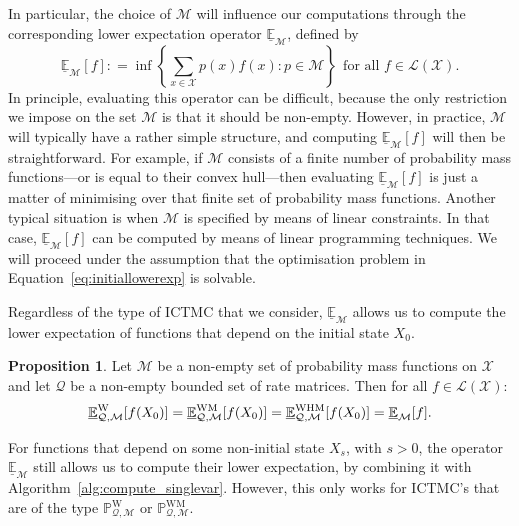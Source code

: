 \documentclass[10pt,a4paper]{paper}
\theoremstyle{definition}
\newtheorem{proposition}[theorem]{Proposition}
\newcommand{\states}{\mathcal{X}}
\newcommand{\processes}{\mathbb{P}}
\newcommand{\wprocesses}{\processes^{\mathrm{W}}}
\newcommand{\wmprocesses}{\processes^{\mathrm{WM}}}
\newcommand{\gambles}{\mathcal{L}}
\newcommand{\gamblesX}{\gambles(\states)}
\newcommand{\rateset}{\mathcal{Q}}
\newcommand{\coloneqq}{:\!=}
\newcommand{\ictmc}{{ICTMC}}
\begin{document}
In particular, the choice of $\mathcal{M}$ will influence our computations through the corresponding lower expectation operator $\underline{\mathbb{E}}_{\mathcal{M}}$, defined by
\begin{equation}\label{eq:initiallowerexp}
\underline{\mathbb{E}}_{\mathcal{M}}[f]
\coloneqq
\inf
\left\{\sum_{x\in\states}p(x)f(x)\colon p\in\mathcal{M}\right\}
~~\text{for all $f\in\gamblesX$.}
\end{equation}
In principle, evaluating this operator can be difficult, because the only restriction we impose on the set $\mathcal{M}$ is that it should be non-empty. However, in practice, $\mathcal{M}$ will typically have a rather simple  structure, and computing $\underline{\mathbb{E}}_\mathcal{M}[f]$ will then be straightforward. For example, if $\mathcal{M}$ consists of a finite number of probability mass functions---or is equal to their convex hull---then evaluating $\underline{\mathbb{E}}_\mathcal{M}[f]$ is just a matter of minimising over that finite set of probability mass functions.
Another typical situation is when $\mathcal{M}$ is specified by means of linear constraints. In that case, $\underline{\mathbb{E}}_\mathcal{M}[f]$ can be computed by means of linear programming techniques. We will proceed under the assumption that the optimisation problem in Equation~\eqref{eq:initiallowerexp} is solvable.

Regardless of the type of {\ictmc} that we consider, $\underline{\mathbb{E}}_{\mathcal{M}}$ allows us to compute the lower expectation of functions that depend on the initial state $X_0$.

\begin{proposition}\label{prop:computeinitial}
Let $\mathcal{M}$ be a non-empty set of probability mass functions on $\states$ and let $\rateset$ be a non-empty bounded set of rate matrices. Then for all $f\in\gamblesX$:
\begin{equation*}
\underline{\mathbb{E}}^\mathrm{W}_{\rateset,\mathcal{M}}[f(X_0)]
=
\underline{\mathbb{E}}^\mathrm{WM}_{\rateset,\mathcal{M}}[f(X_0)]
=
\underline{\mathbb{E}}^\mathrm{WHM}_{\rateset,\mathcal{M}}[f(X_0)]
=
\underline{\mathbb{E}}_{\mathcal{M}}[f].\vspace{4pt}
\end{equation*}
\end{proposition}

For functions that depend on some non-initial state $X_s$, with $s>0$, the operator $\underline{\mathbb{E}}_{\mathcal{M}}$ still allows us to compute their lower expectation, by combining it with Algorithm~\ref{alg:compute_singlevar}. However, this only works for {\ictmc}'s that are of the type $\wprocesses_{\rateset,\mathcal{M}}$ or $\wmprocesses_{\rateset,\mathcal{M}}$.%
\end{document}
